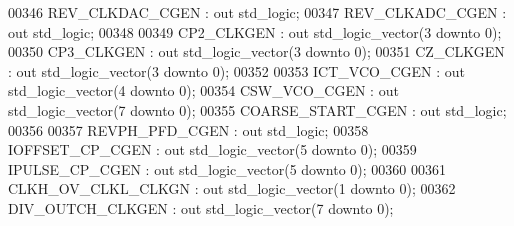 \begin{DoxyCode}
00346         REV\_CLKDAC\_CGEN         : \textcolor{keywordflow}{out} \textcolor{comment}{std\_logic};
00347         REV\_CLKADC\_CGEN         : \textcolor{keywordflow}{out} \textcolor{comment}{std\_logic}; 
00348 
00349         CP2\_CLKGEN                  : \textcolor{keywordflow}{out} \textcolor{comment}{std\_logic\_vector}(\textcolor{vhdllogic}{}\textcolor{vhdllogic}{3} \textcolor{keywordflow}{downto} \textcolor{vhdllogic}{}\textcolor{vhdllogic}{0});
00350         CP3\_CLKGEN                  : \textcolor{keywordflow}{out} \textcolor{comment}{std\_logic\_vector}(\textcolor{vhdllogic}{}\textcolor{vhdllogic}{3} \textcolor{keywordflow}{downto} \textcolor{vhdllogic}{}\textcolor{vhdllogic}{0});
00351         CZ\_CLKGEN                       : \textcolor{keywordflow}{out} \textcolor{comment}{std\_logic\_vector}(\textcolor{vhdllogic}{}\textcolor{vhdllogic}{3} \textcolor{keywordflow}{downto} \textcolor{vhdllogic}{}\textcolor{vhdllogic}{0});
00352 
00353         ICT\_VCO\_CGEN                : \textcolor{keywordflow}{out} \textcolor{comment}{std\_logic\_vector}(\textcolor{vhdllogic}{}\textcolor{vhdllogic}{4} \textcolor{keywordflow}{downto} \textcolor{vhdllogic}{}\textcolor{vhdllogic}{0});
00354         CSW\_VCO\_CGEN                : \textcolor{keywordflow}{out} \textcolor{comment}{std\_logic\_vector}(\textcolor{vhdllogic}{}\textcolor{vhdllogic}{7} \textcolor{keywordflow}{downto} \textcolor{vhdllogic}{}\textcolor{vhdllogic}{0});
00355         COARSE\_START\_CGEN       : \textcolor{keywordflow}{out} \textcolor{comment}{std\_logic};
00356 
00357         REVPH\_PFD\_CGEN          : \textcolor{keywordflow}{out} \textcolor{comment}{std\_logic};
00358         IOFFSET\_CP\_CGEN         : \textcolor{keywordflow}{out} \textcolor{comment}{std\_logic\_vector}(\textcolor{vhdllogic}{}\textcolor{vhdllogic}{5} \textcolor{keywordflow}{downto} \textcolor{vhdllogic}{}\textcolor{vhdllogic}{0});
00359         IPULSE\_CP\_CGEN          : \textcolor{keywordflow}{out} \textcolor{comment}{std\_logic\_vector}(\textcolor{vhdllogic}{}\textcolor{vhdllogic}{5} \textcolor{keywordflow}{downto} \textcolor{vhdllogic}{}\textcolor{vhdllogic}{0});
00360 
00361         CLKH\_OV\_CLKL\_CLKGN  : \textcolor{keywordflow}{out} \textcolor{comment}{std\_logic\_vector}(\textcolor{vhdllogic}{}\textcolor{vhdllogic}{1} \textcolor{keywordflow}{downto} \textcolor{vhdllogic}{}\textcolor{vhdllogic}{0});
00362         DIV\_OUTCH\_CLKGEN        : \textcolor{keywordflow}{out} \textcolor{comment}{std\_logic\_vector}(\textcolor{vhdllogic}{}\textcolor{vhdllogic}{7} \textcolor{keywordflow}{downto} \textcolor{vhdllogic}{}\textcolor{vhdllogic}{0});

\end{DoxyCode}
